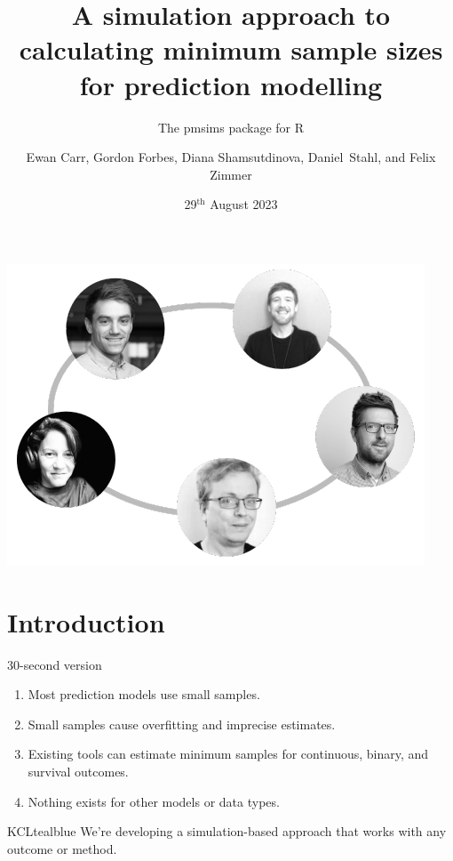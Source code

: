 \documentclass[11pt]{beamer}
\title[The pmsims package for R]{
    A simulation approach to calculating minimum sample sizes for prediction
    modelling
}
\subtitle{The pmsims package for R}
\date{29$^{\text{th}}$ August 2023}
\author[Biostatistics \& Health Informatics, KCL]{%
    Ewan Carr, Gordon Forbes, Diana Shamsutdinova, \mbox{Daniel Stahl},
	and Felix Zimmer}
\institute[]{Department of Biostatistics \& Health Informatics\\ King's College London}
\newcommand{\sgap}{\vspace{0.5em}}
\begin{document}
\maketitle

\begin{frame}[c]
	\vspace{1em}
	\includegraphics[width=\textwidth]{figures/group_photos.pdf}%
\end{frame}


\section{Introduction}

\begin{frame}[c]{30-second version}
	\Large
	\begin{enumerate}
		\setlength{\itemsep}{12pt}

		\item Most prediction models use small samples.

		\item Small samples cause overfitting and imprecise estimates.

		\item Existing tools can estimate minimum samples for continuous,
		      binary, and survival outcomes.

		\item Nothing exists for other models or data types.

	\end{enumerate}

	\sgap

	\begin{cbox}{KCLtealblue}{}
		We're developing a simulation-based approach that works with any
		outcome or method.
	\end{cbox}
	\vspace{-1em}
\end{frame}
\end{document}
